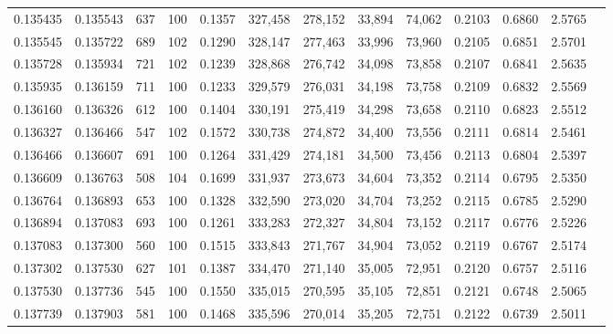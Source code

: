 \begin{tabular}{rrrrrrrrrrrrr}
0.135435 & 0.135543 &   637 & 100 &                                     0.1357 & 327,458 & 278,152 &  33,894 &  74,062 & 0.2103 & 0.6860 & 2.5765 \\
0.135545 & 0.135722 &   689 & 102 &                                     0.1290 & 328,147 & 277,463 &  33,996 &  73,960 & 0.2105 & 0.6851 & 2.5701 \\
0.135728 & 0.135934 &   721 & 102 &                                     0.1239 & 328,868 & 276,742 &  34,098 &  73,858 & 0.2107 & 0.6841 & 2.5635 \\
0.135935 & 0.136159 &   711 & 100 &                                     0.1233 & 329,579 & 276,031 &  34,198 &  73,758 & 0.2109 & 0.6832 & 2.5569 \\
0.136160 & 0.136326 &   612 & 100 &                                     0.1404 & 330,191 & 275,419 &  34,298 &  73,658 & 0.2110 & 0.6823 & 2.5512 \\
0.136327 & 0.136466 &   547 & 102 &                                     0.1572 & 330,738 & 274,872 &  34,400 &  73,556 & 0.2111 & 0.6814 & 2.5461 \\
0.136466 & 0.136607 &   691 & 100 &                                     0.1264 & 331,429 & 274,181 &  34,500 &  73,456 & 0.2113 & 0.6804 & 2.5397 \\
0.136609 & 0.136763 &   508 & 104 &                                     0.1699 & 331,937 & 273,673 &  34,604 &  73,352 & 0.2114 & 0.6795 & 2.5350 \\
0.136764 & 0.136893 &   653 & 100 &                                     0.1328 & 332,590 & 273,020 &  34,704 &  73,252 & 0.2115 & 0.6785 & 2.5290 \\
0.136894 & 0.137083 &   693 & 100 &                                     0.1261 & 333,283 & 272,327 &  34,804 &  73,152 & 0.2117 & 0.6776 & 2.5226 \\
0.137083 & 0.137300 &   560 & 100 &                                     0.1515 & 333,843 & 271,767 &  34,904 &  73,052 & 0.2119 & 0.6767 & 2.5174 \\
0.137302 & 0.137530 &   627 & 101 &                                     0.1387 & 334,470 & 271,140 &  35,005 &  72,951 & 0.2120 & 0.6757 & 2.5116 \\
0.137530 & 0.137736 &   545 & 100 &                                     0.1550 & 335,015 & 270,595 &  35,105 &  72,851 & 0.2121 & 0.6748 & 2.5065 \\
0.137739 & 0.137903 &   581 & 100 &                                     0.1468 & 335,596 & 270,014 &  35,205 &  72,751 & 0.2122 & 0.6739 & 2.5011 \\

\end{tabular}
